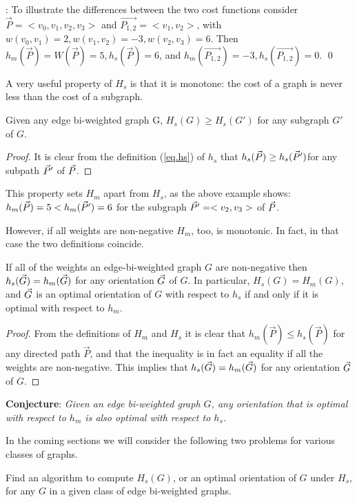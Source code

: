 : To illustrate the differences between the two cost functions consider
 $\vec{P}=<v_0,v_1,v_2,v_3>$ and $\vec{P_{1,2}}=<v_1,v_2>$, with $w(v_0,v_1)=2, w(v_1,v_2)=-3,w(v_2,v_3)=6$.
 Then $h_m(\vec{P})=W(\vec{P})=5, h_s(\vec{P})=6$, and 
 $h_m(\vec{P_{1,2}})=-3, h_s(\vec{P_{1,2}})=0$.
 \qed

A very useful property of $H_s$ is that it is monotone: the cost of a graph is never less than the cost of a subgraph.
\begin{lemma}\label{lem:sprop}
	Given any edge bi-weighted graph G,
	$H_{s}(G)\geq  H_{s}(G')$ for any subgraph $G'$ of $G$. 
\end{lemma}

\begin{proof}
It is clear from the definition (\ref{eq.hs}) of $h_s$ that $h_s(\vec{P})\geq h_s(\vec{P} ')$for any subpath 
$\vec{P} '$ of $\vec{P}$.  
\end{proof}

This property sets $H_m$ apart from $H_s$,  as the above example shows:
$h_{m}(\vec{P})=5 <  h_{m}(\vec{P}')=6$ for the subgraph $\vec{P} '=<v_2,v_3>$ of $\vec{P}$.

However, if all weights are non-negative $H_m$, too, is monotonic. In fact, in that case the two definitions coincide.

\begin{lemma}
	If all of the weights an edge-bi-weighted graph $G$ are non-negative 
	then $h_{s}( \vec{G} )= h_{m}( \vec{G} )$ for any orientation $\vec{G}$ of $G$.
	In particular,  $H_{s}(G)= H_{m}(G)$,  and 
	$\vec{G}$ is an optimal orientation of $G$ with respect to $h_{s}$
	if and only if it is optimal with respect to $ h_{m} $.
\end{lemma}
\begin{proof}
From the definitions of $H_m$ and $H_s$ it is clear that  $h_{m}(\vec{P})\leq  h_{s}(\vec{P})$
for any directed path $\vec{P}$, and that the inequality is in fact an equality if all the weights 
are non-negative. This implies that $h_{s}( \vec{G} )= h_{m}( \vec{G} )$ for any orientation $\vec{G}$ of $G$.
\end{proof}

{\bf Conjecture}:
\textit{Given an edge bi-weighted graph $G$, any orientation that is optimal with 
	respect to $h_{m}$ is also optimal with respect to $h_{s} $.}

\medskip
In the coming sections we will consider the following two problems
for various classes of graphs.

\begin{problem}
	Find an algorithm to compute
	$H_s(G) $, or an optimal orientation of $G$ under $H_s$,
	for any $G$ in a given class of edge bi-weighted graphs.
\end{problem}

